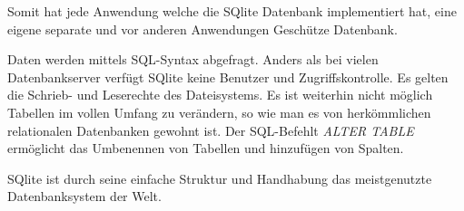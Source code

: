 Somit hat jede Anwendung welche die SQlite Datenbank implementiert hat, eine eigene separate und vor anderen Anwendungen Geschütze Datenbank.

Daten werden mittels SQL-Syntax abgefragt. Anders als bei vielen Datenbankserver verfügt SQlite keine Benutzer und Zugriffskontrolle. Es gelten die Schrieb- und Leserechte des Dateisystems. Es ist weiterhin nicht möglich Tabellen im vollen Umfang zu verändern, so wie man es von herkömmlichen relationalen Datenbanken gewohnt ist. Der SQL-Befehlt \textit{ALTER TABLE} ermöglicht das Umbenennen von Tabellen und hinzufügen von Spalten.

SQlite ist durch seine einfache Struktur und Handhabung das meistgenutzte Datenbanksystem der Welt.
